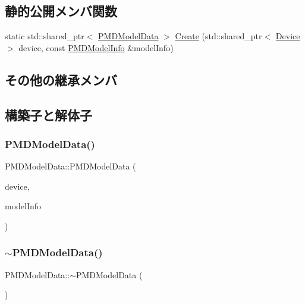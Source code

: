 \subsection*{静的公開メンバ関数}
\begin{DoxyCompactItemize}
\item 
static std\+::shared\+\_\+ptr$<$ \mbox{\hyperlink{class_p_m_d_model_data}{P\+M\+D\+Model\+Data}} $>$ \mbox{\hyperlink{class_p_m_d_model_data_a026bc021f9c229a820054b50821d9171}{Create}} (std\+::shared\+\_\+ptr$<$ \mbox{\hyperlink{class_device}{Device}} $>$ device, const \mbox{\hyperlink{struct_p_m_d_model_info}{P\+M\+D\+Model\+Info}} \&model\+Info)
\end{DoxyCompactItemize}
\subsection*{その他の継承メンバ}


\subsection{構築子と解体子}
\mbox{\label{class_p_m_d_model_data_a75af9f2a3f48724d2c4670cc4c117a0f}} 
\subsubsection{\texorpdfstring{P\+M\+D\+Model\+Data()}{PMDModelData()}}
{\footnotesize\ttfamily P\+M\+D\+Model\+Data\+::\+P\+M\+D\+Model\+Data (\begin{DoxyParamCaption}\item[{std\+::shared\+\_\+ptr$<$ \mbox{\hyperlink{class_device}{Device}} $>$}]{device,  }\item[{const \mbox{\hyperlink{struct_p_m_d_model_info}{P\+M\+D\+Model\+Info}} \&}]{model\+Info }\end{DoxyParamCaption})}

\mbox{\label{class_p_m_d_model_data_a5cc7bb8b8046d533f3d38f5e056cf627}} 
\subsubsection{\texorpdfstring{$\sim$\+P\+M\+D\+Model\+Data()}{~PMDModelData()}}
{\footnotesize\ttfamily P\+M\+D\+Model\+Data\+::$\sim$\+P\+M\+D\+Model\+Data (\begin{DoxyParamCaption}{ }\end{DoxyParamCaption})}



